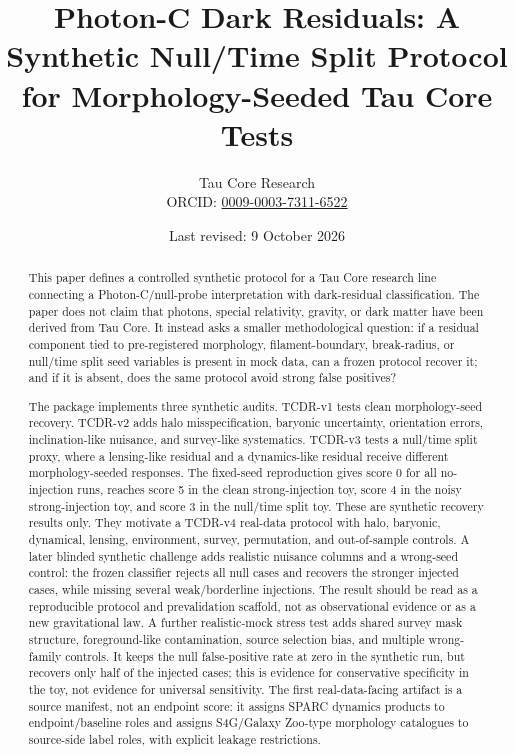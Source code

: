 \documentclass[11pt]{article}
\title{Photon-C Dark Residuals: A Synthetic Null/Time Split Protocol for Morphology-Seeded Tau Core Tests}
\author{Tau Core Research\\{\small ORCID: \href{https://orcid.org/0009-0003-7311-6522}{0009-0003-7311-6522}}}
\date{Last revised: 9 October 2026}
\begin{document}
\maketitle

\begin{abstract}
This paper defines a controlled synthetic protocol for a Tau Core research
line connecting a Photon-C/null-probe interpretation with dark-residual
classification.  The paper does not claim that photons, special relativity,
gravity, or dark matter have been derived from Tau Core.  It instead asks a
smaller methodological question: if a residual component tied to
pre-registered morphology, filament-boundary, break-radius, or null/time split
seed variables is present in mock data, can a frozen protocol recover it; and
if it is absent, does the same protocol avoid strong false positives?

The package implements three synthetic audits.  TCDR-v1 tests clean
morphology-seed recovery.  TCDR-v2 adds halo misspecification, baryonic
uncertainty, orientation errors, inclination-like nuisance, and survey-like
systematics.  TCDR-v3 tests a null/time split proxy, where a lensing-like
residual and a dynamics-like residual receive different morphology-seeded
responses.  The fixed-seed reproduction gives score 0 for all no-injection
runs, reaches score 5 in the clean strong-injection toy, score 4 in the noisy
strong-injection toy, and score 3 in the null/time split toy.  These are
synthetic recovery results only.  They motivate a TCDR-v4 real-data protocol
with halo, baryonic, dynamical, lensing, environment, survey, permutation, and
out-of-sample controls.  A later blinded synthetic challenge adds realistic
nuisance columns and a wrong-seed control: the frozen classifier rejects all
null cases and recovers the stronger injected cases, while missing several
weak/borderline injections.  The result should be read as a reproducible
protocol and prevalidation scaffold, not as observational evidence or as a new
gravitational law.  A further realistic-mock stress test adds shared survey
mask structure, foreground-like contamination, source selection bias, and
multiple wrong-family controls.  It keeps the null false-positive rate at zero
in the synthetic run, but recovers only half of the injected cases; this is
evidence for conservative specificity in the toy, not evidence for universal
sensitivity.  The first real-data-facing artifact is a source manifest, not an
endpoint score: it assigns SPARC dynamics products to endpoint/baseline roles
and assigns S4G/Galaxy Zoo-type morphology catalogues to source-side label
roles, with explicit leakage restrictions.
\end{abstract}
\end{document}
